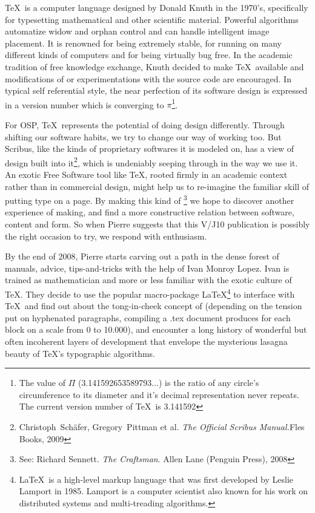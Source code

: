 \TeX\ is a computer language designed by Donald Knuth in the
1970's, specifically for typesetting mathematical and
other scientific material. Powerful algorithms automatize widow and
orphan control and can handle intelligent image placement. It is
renowned for being extremely stable, for running on many different
kinds of computers and for being virtually bug free. In the academic
tradition of free knowledge exchange, Knuth decided to make \TeX\
available  and
modifications of or experimentations with the source code are
encouraged. In typical self referential style, the near perfection of
its software design is expressed in a version number which is
converging to ${\pi}$\footnote{The value of ${\Pi}$
(3.141592653589793...) is the ratio of any circle's
circumference to its diameter and it's decimal
representation never repeats. The current version number of \TeX\ is
3.141592}.

For OSP, \TeX\ represents the potential of doing design differently.
Through shifting our software habits, we try to change our way of
working too. But Scribus, like the kinds of proprietary softwares it is
modeled on, has a \quote{productionalist}
view of design built into it\footnote{ Christoph~Sch\"afer, Gregory~Pittman et
al. {\em The Official Scribus Manual.}Fles Books, 2009}, which is
undeniably seeping through in the way we use it. An exotic Free
Software tool like \TeX, rooted firmly in an academic context rather
than in commercial design, might help us to re-imagine the familiar
skill of putting type on a page. By making this kind of
 \footnote{
See: Richard
Sennett. {\em The Craftsman}. Allen Lane (Penguin Press), 2008} we
hope to discover another experience of making, and find a more
constructive relation between software, content and form. So when Pierre
suggests that this V/J10 publication is possibly the right occasion to
try, we respond with enthusiasm.

By the end of 2008, Pierre starts carving out a path in the dense forest
of manuals, advice, tips-and-tricks with the help of Ivan Monroy Lopez.
Ivan is trained as mathematician and more or less familiar with the
exotic culture of \TeX. They decide to use the popular macro-package
\LaTeX\footnote{\LaTeX\ is a high-level markup language that was first
developed by Leslie Lamport in 1985. Lamport is a computer scientist
also known for his work on distributed systems and multi-treading
algorithms.} to interface with \TeX\ and find out about the tong-in-cheek
concept of  (depending on the
tension put on hyphenated paragraphs, compiling a .tex document
produces \quote{badness} for each block on a
scale from 0 to 10.000), and encounter a long history of wonderful but
often incoherent layers of development that envelope the mysterious
lasagna beauty of \TeX's typographic algorithms.

